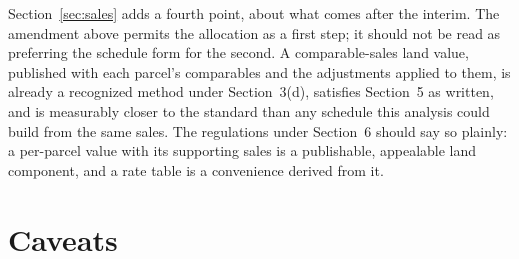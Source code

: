 \documentclass[11pt]{article}
\begin{document}
Section~\ref{sec:sales} adds a fourth point, about what comes after the interim. The
amendment above permits the allocation as a first step; it should not be read as preferring
the schedule form for the second. A comparable-sales land value, published with each
parcel's comparables and the adjustments applied to them, is already a recognized method under
Section~3(d), satisfies Section~5 as written, and is measurably closer to the standard than any
schedule this analysis could build from the same sales. The regulations under Section~6 should
say so plainly: a per-parcel value with its supporting sales is a publishable, appealable land
component, and a rate table is a convenience derived from it.

\section{Caveats}
\end{document}
